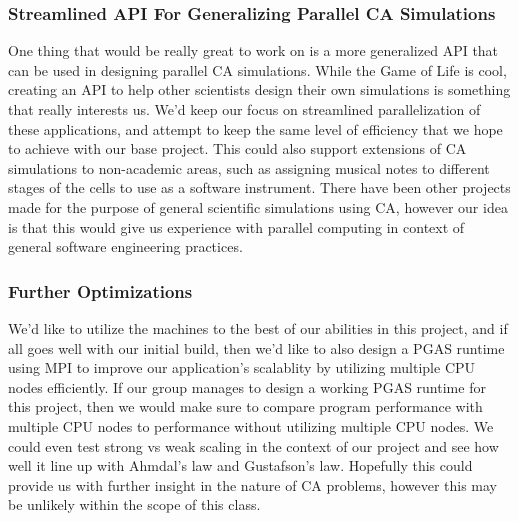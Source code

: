 \documentclass[12pt]{article}
\begin{document}
\subsubsection{Streamlined API For Generalizing Parallel CA Simulations}
One thing that would be really great to work on is a more generalized API that can be used in designing parallel CA simulations. While the Game of Life is cool, creating an API to help other scientists design their own simulations is something that really interests us. We'd keep our focus on streamlined parallelization of these applications, and attempt to keep the same level of efficiency that we hope to achieve with our base project. This could also support extensions of CA simulations to non-academic areas, such as assigning musical notes to different stages of the cells to use as a software instrument. There have been other projects made for the purpose of general scientific simulations using CA, however our idea is that this would give us experience with parallel computing in context of general software engineering practices.

\par
\subsubsection{Further Optimizations}
We'd like to utilize the machines to the best of our abilities in this project, and if all goes well with our initial build, then we'd like to also design a PGAS runtime using MPI to improve our application's scalablity by utilizing multiple CPU nodes efficiently. If our group manages to design a working PGAS runtime for this project, then we would make sure to compare program performance with multiple CPU nodes to performance without utilizing multiple CPU nodes. We could even test strong vs weak scaling in the context of our project and see how well it line up with Ahmdal's law and Gustafson's law. Hopefully this could provide us with further insight in the nature of CA problems, however this may be unlikely within the scope of this class.


\end{document}
